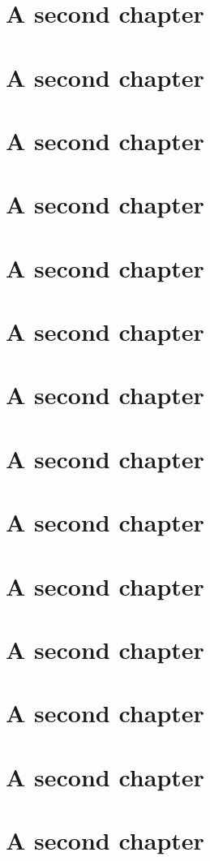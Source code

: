 \documentclass{memoir}
\begin{document}
\chapter{A second chapter}
\chapter{A second chapter}
\chapter{A second chapter}
\chapter{A second chapter}
\chapter{A second chapter}
\chapter{A second chapter}
\chapter{A second chapter}
\chapter{A second chapter}
\chapter{A second chapter}
\chapter{A second chapter}
\chapter{A second chapter}
\chapter{A second chapter}
\chapter{A second chapter}
\chapter{A second chapter}
\end{document}
